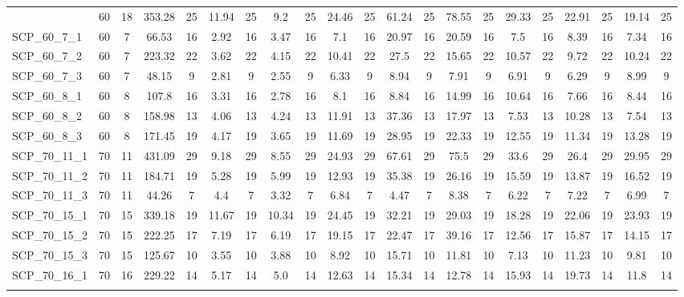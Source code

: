 \begin{sidewaystable}[!ht]
{\begin{tabular}{lcccccccccccccccccccc}
{SCP\_60\_18\_3 & 60 & 18 & 353.28 & 25 & 11.94 & 25 &  \textcolor{blue2}{9.2} & 25 & 24.46 & 25 & 61.24 & 25 & 78.55 & 25 & 29.33 & 25 & 22.91 & 25 & 19.14 & 25 \\
SCP\_60\_7\_1 & 60 & 7 & 66.53 & 16 &  \textcolor{blue2}{2.92} & 16 & 3.47 & 16 & 7.1 & 16 & 20.97 & 16 & 20.59 & 16 & 7.5 & 16 & 8.39 & 16 & 7.34 & 16 \\
SCP\_60\_7\_2 & 60 & 7 & 223.32 & 22 &  \textcolor{blue2}{3.62} & 22 & 4.15 & 22 & 10.41 & 22 & 27.5 & 22 & 15.65 & 22 & 10.57 & 22 & 9.72 & 22 & 10.24 & 22 \\
SCP\_60\_7\_3 & 60 & 7 & 48.15 & 9 & 2.81 & 9 &  \textcolor{blue2}{2.55} & 9 & 6.33 & 9 & 8.94 & 9 & 7.91 & 9 & 6.91 & 9 & 6.29 & 9 & 8.99 & 9 \\
SCP\_60\_8\_1 & 60 & 8 & 107.8 & 16 & 3.31 & 16 &  \textcolor{blue2}{2.78} & 16 & 8.1 & 16 & 8.84 & 16 & 14.99 & 16 & 10.64 & 16 & 7.66 & 16 & 8.44 & 16 \\
SCP\_60\_8\_2 & 60 & 8 & 158.98 & 13 &  \textcolor{blue2}{4.06} & 13 & 4.24 & 13 & 11.91 & 13 & 37.36 & 13 & 17.97 & 13 & 7.53 & 13 & 10.28 & 13 & 7.54 & 13 \\
SCP\_60\_8\_3 & 60 & 8 & 171.45 & 19 & 4.17 & 19 &  \textcolor{blue2}{3.65} & 19 & 11.69 & 19 & 28.95 & 19 & 22.33 & 19 & 12.55 & 19 & 11.34 & 19 & 13.28 & 19 \\
SCP\_70\_11\_1 & 70 & 11 & 431.09 & 29 & 9.18 & 29 &  \textcolor{blue2}{8.55} & 29 & 24.93 & 29 & 67.61 & 29 & 75.5 & 29 & 33.6 & 29 & 26.4 & 29 & 29.95 & 29 \\
SCP\_70\_11\_2 & 70 & 11 & 184.71 & 19 &  \textcolor{blue2}{5.28} & 19 & 5.99 & 19 & 12.93 & 19 & 35.38 & 19 & 26.16 & 19 & 15.59 & 19 & 13.87 & 19 & 16.52 & 19 \\
SCP\_70\_11\_3 & 70 & 11 & 44.26 & 7 & 4.4 & 7 &  \textcolor{blue2}{3.32} & 7 & 6.84 & 7 & 4.47 & 7 & 8.38 & 7 & 6.22 & 7 & 7.22 & 7 & 6.99 & 7 \\
SCP\_70\_15\_1 & 70 & 15 & 339.18 & 19 & 11.67 & 19 &  \textcolor{blue2}{10.34} & 19 & 24.45 & 19 & 32.21 & 19 & 29.03 & 19 & 18.28 & 19 & 22.06 & 19 & 23.93 & 19 \\
SCP\_70\_15\_2 & 70 & 15 & 222.25 & 17 & 7.19 & 17 &  \textcolor{blue2}{6.19} & 17 & 19.15 & 17 & 22.47 & 17 & 39.16 & 17 & 12.56 & 17 & 15.87 & 17 & 14.15 & 17 \\
SCP\_70\_15\_3 & 70 & 15 & 125.67 & 10 &  \textcolor{blue2}{3.55} & 10 & 3.88 & 10 & 8.92 & 10 & 15.71 & 10 & 11.81 & 10 & 7.13 & 10 & 11.23 & 10 & 9.81 & 10 \\
SCP\_70\_16\_1 & 70 & 16 & 229.22 & 14 & 5.17 & 14 &  \textcolor{blue2}{5.0} & 14 & 12.63 & 14 & 15.34 & 14 & 12.78 & 14 & 15.93 & 14 & 19.73 & 14 & 11.8 & 14 \\
}
\end{tabular}}
\end{sidewaystable}
